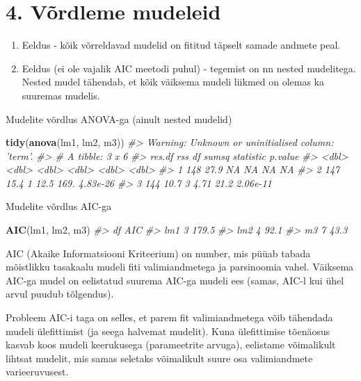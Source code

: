 \documentclass[]{book}
\newenvironment{Shaded}{\begin{snugshade}}{\end{snugshade}}
\newcommand{\CommentTok}[1]{\textcolor[rgb]{0.56,0.35,0.01}{\textit{#1}}}
\newcommand{\KeywordTok}[1]{\textcolor[rgb]{0.13,0.29,0.53}{\textbf{#1}}}
\newcommand{\NormalTok}[1]{#1}
\begin{document}
\hypertarget{vordleme-mudeleid}{%
\section*{4. Võrdleme mudeleid}\label{vordleme-mudeleid}}

\begin{enumerate}
\def\labelenumi{\arabic{enumi}.}
\item
  Eeldus - kõik võrreldavad mudelid on fititud täpselt samade andmete peal.
\item
  Eeldus (ei ole vajalik AIC meetodi puhul) - tegemist on nn nested mudelitega. Nested mudel tähendab, et kõik väiksema mudeli liikmed on olemas ka suuremas mudelis.
\end{enumerate}

Mudelite võrdlus ANOVA-ga (ainult nested mudelid)

\begin{Shaded}
\begin{Highlighting}[]
\KeywordTok{tidy}\NormalTok{(}\KeywordTok{anova}\NormalTok{(lm1, lm2, m3))}
\CommentTok{#> Warning: Unknown or uninitialised column: 'term'.}
\CommentTok{#> # A tibble: 3 x 6}
\CommentTok{#>   res.df   rss    df sumsq statistic   p.value}
\CommentTok{#>    <dbl> <dbl> <dbl> <dbl>     <dbl>     <dbl>}
\CommentTok{#> 1    148  27.9    NA NA         NA   NA       }
\CommentTok{#> 2    147  15.4     1 12.5      169.   4.83e-26}
\CommentTok{#> 3    144  10.7     3  4.71      21.2  2.06e-11}
\end{Highlighting}
\end{Shaded}

Mudelite võrdlus AIC-ga

\begin{Shaded}
\begin{Highlighting}[]
\KeywordTok{AIC}\NormalTok{(lm1, lm2, m3)}
\CommentTok{#>     df   AIC}
\CommentTok{#> lm1  3 179.5}
\CommentTok{#> lm2  4  92.1}
\CommentTok{#> m3   7  43.3}
\end{Highlighting}
\end{Shaded}

AIC (Akaike Informatsiooni Kriteerium) on number, mis püüab tabada mõistlikku tasakaalu mudeli fiti valimiandmetega ja parsinoomia vahel. Väiksema AIC-ga mudel on eelistatud suurema AIC-ga mudeli ees (samas, AIC-l kui ühel arvul puudub tõlgendus).

Probleem AIC-i taga on selles, et parem fit valimiandmetega võib tähendada mudeli ülefittimist (ja seega halvemat mudelit). Kuna ülefittimise tõenäosus kasvab koos mudeli keerukusega (parameetrite arvuga), eelistame võimalikult lihtsat mudelit, mis samas seletaks võimalikult suure osa valimiandmete varieeruvusest.
\end{document}
